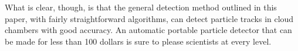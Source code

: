 \documentclass[notitlepage]{article}
\begin{document}
What is clear, though, is that the general detection method outlined in this paper, with fairly straightforward algorithms, can detect particle tracks in cloud chambers with good accuracy.  An automatic portable particle detector that can be made for less than 100 dollars is sure to please scientists at every level.


%
%
%
%
%
%
\end{document}
